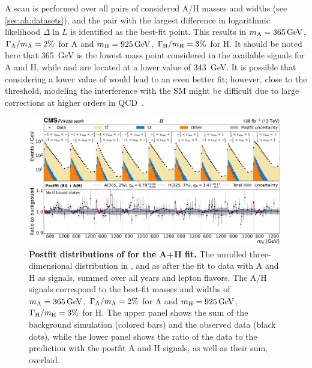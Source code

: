 A scan is performed over all pairs of considered A/H masses and widths (see \cref{sec:ah:datasets}), and the pair with the largest difference in logarithmic likelihood $\Delta \ln L$ is identified as the best-fit point. This results in $\mA = \SI{365}{\GeV}$, $\Gamma_{\mathrm{A}}/m_{\mathrm{A}} = 2\%$ for A and $\mH = \SI{925}{\GeV}$, $\Gamma_{\mathrm{H}}/m_{\mathrm{H}} = 3\%$ for H. It should be noted here that \SI{365}{\GeV} is the lowest mass point considered in the available signals for A and H, while \etat and \chit are located at a lower value of \SI{343}{\GeV}. It is possible that considering a lower value of \mA would lead to an even better fit; however, close to the \ttbar threshold, modeling the interference with the SM might be difficult due to large corrections at higher orders in QCD~\cite{Djouadi:2019,Djouadi:2024lyv}.

\begin{figure}[!th]
    \centering
    \includegraphics[width=0.99\textwidth]{figures/ah/prepost/A_m365_w2p0__H_m925_w3p0_fit_s_ll_run2_both.pdf}
    \caption{
        \textbf{Postfit distributions of \mttchelchan for the A+H fit.} The unrolled three-dimensional distribution in \mtt, \chel and \chan as after the fit to data with A and H as signals, summed over all years and lepton flavors. The A/H signals correspond to the best-fit masses and widths of $\mA = \SI{365}{\GeV}$, $\Gamma_{\mathrm{A}}/m_{\mathrm{A}} = 2\%$ for A and $\mH = \SI{925}{\GeV}$, $\Gamma_{\mathrm{H}}/m_{\mathrm{H}} = 3\%$ for H. The upper panel shows the sum of the background simulation (colored bars) and the observed data (black dots), while the lower panel shows the ratio of the data to the prediction with the postfit A and H signals, as well as their sum, overlaid.
    }
    \label{fig:ah:postfit_ah_ll}
\end{figure}

